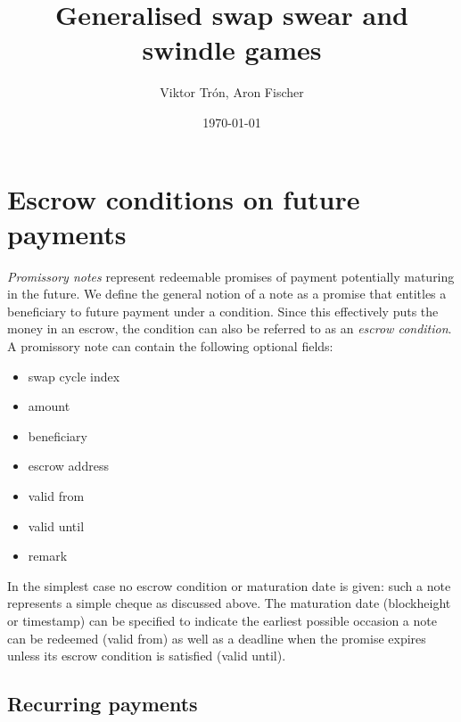 \documentclass[a4paper,10pt]{article}
\title{Generalised swap swear and swindle games}
\author{Viktor Trón, Aron Fischer}
\date{\today}
\newcommand\gloss[1]{\emph{\gls{#1}}}
\begin{document}
\maketitle
\begin{abstract}
\end{abstract}

\tableofcontents






\section{Escrow conditions on future payments}

\gloss{Promissory notes} represent redeemable promises of payment potentially maturing in the future.
We define the general notion of a note as a promise that entitles a beneficiary to future payment
under a condition. Since this effectively puts the money in an escrow, the condition can
also be referred to as an \gloss{escrow condition}.
A promissory note can contain the following optional fields:

  \begin{itemize}
    \item swap cycle index
    \item amount
    \item beneficiary
    \item escrow address
    \item valid from
    \item valid until
    \item remark
  \end{itemize}

In the simplest case no escrow condition or maturation date is given: such a note
represents a simple cheque as discussed above.
The maturation date (blockheight or timestamp) can be specified to indicate the earliest
possible occasion a note can be redeemed (valid from) as well as a deadline when the promise
expires unless its escrow condition is satisfied (valid until).

\subsection{Recurring payments}
\end{document}
